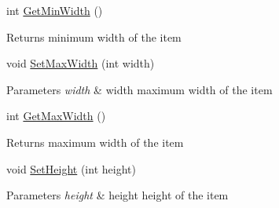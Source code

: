 \begin{DoxyCompactItemize}
int \mbox{\hyperlink{class_space_v_i_l_1_1_core_1_1_geometry_a2bbfcded483da237ab2a030fd75552ba}{Get\+Min\+Width}} ()
\begin{DoxyCompactList}\small\item\em \begin{DoxyReturn}{Returns}
minimum width of the item 
\end{DoxyReturn}
\end{DoxyCompactList}\item 
\mbox{\label{class_space_v_i_l_1_1_core_1_1_geometry_a8e07da835d5948970961cfa91dbee1e8}} 
void \mbox{\hyperlink{class_space_v_i_l_1_1_core_1_1_geometry_a8e07da835d5948970961cfa91dbee1e8}{Set\+Max\+Width}} (int width)
\begin{DoxyCompactList}\small\item\em 
\begin{DoxyParams}{Parameters}
{\em width} & width maximum width of the item \\
\hline
\end{DoxyParams}
\end{DoxyCompactList}\item 
\mbox{\label{class_space_v_i_l_1_1_core_1_1_geometry_af51cf61361b5adafb37673cc4b40e476}} 
int \mbox{\hyperlink{class_space_v_i_l_1_1_core_1_1_geometry_af51cf61361b5adafb37673cc4b40e476}{Get\+Max\+Width}} ()
\begin{DoxyCompactList}\small\item\em \begin{DoxyReturn}{Returns}
maximum width of the item 
\end{DoxyReturn}
\end{DoxyCompactList}\item 
\mbox{\label{class_space_v_i_l_1_1_core_1_1_geometry_aaf6d89a49d5a0330a7e7b88478dc36b7}} 
void \mbox{\hyperlink{class_space_v_i_l_1_1_core_1_1_geometry_aaf6d89a49d5a0330a7e7b88478dc36b7}{Set\+Height}} (int height)
\begin{DoxyCompactList}\small\item\em 
\begin{DoxyParams}{Parameters}
{\em height} & height height of the item \\
\hline
\end{DoxyParams}
\end{DoxyCompactList}\item 

\end{DoxyCompactItemize}
